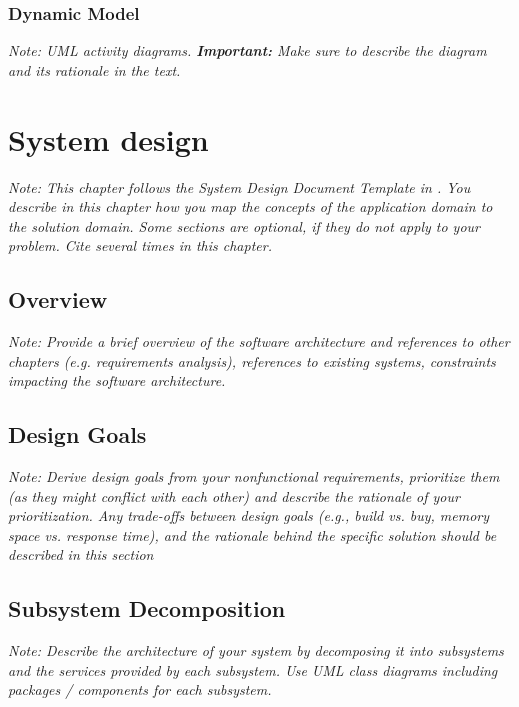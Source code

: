 \documentclass[a4paper,12pt,twoside]{report}
\begin{document}
\subsection{Dynamic Model}

\textit{Note: UML activity diagrams. \textbf{Important:} Make sure to describe the diagram and its rationale in the text.}



\chapter{System design}

\textit{Note: This chapter follows the System Design Document Template in \cite{bruegge2004object}. 
You describe in this chapter how you map the concepts of the application domain to the solution domain. Some sections are optional, if they do not apply to your problem.
Cite \cite{bruegge2004object} several times in this chapter.}

\section{Overview}

\textit{Note: Provide a brief overview of the software architecture and references to other chapters (e.g. requirements analysis), references to existing systems, constraints impacting the software architecture.}

\section{Design Goals}

\textit{Note: Derive design goals from your nonfunctional requirements, prioritize them (as they might conflict with each other) and describe the rationale of your prioritization. Any trade-offs between design goals (e.g., build vs. buy, memory space vs. response time),
and the rationale behind the specific solution should be described in this section}

\section{Subsystem Decomposition}

\textit{Note: Describe the architecture of your system by decomposing it into subsystems and the services provided by each subsystem. Use UML class diagrams including packages / components for each subsystem.}
\end{document}
